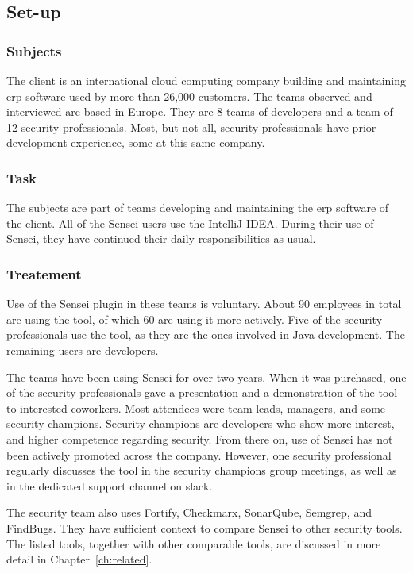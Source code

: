 \subsection{Set-up}

\subsubsection{Subjects}
The client is an international cloud computing company building and maintaining \gls{erp} software used by more than 26,000 customers.
The teams observed and interviewed are based in Europe.
They are 8 teams of developers and a team of 12 security professionals.
Most, but not all, security professionals have prior development experience, some at this same company.

\subsubsection{Task}
The subjects are part of teams developing and maintaining the \gls{erp} software of the client.
All of the Sensei users use the IntelliJ IDEA.
During their use of Sensei, they have continued their daily responsibilities as usual.

\subsubsection{Treatement}
Use of the Sensei plugin in these teams is voluntary.
About 90 employees in total are using the tool, of which 60 are using it more actively.
Five of the security professionals use the tool, as they are the ones involved in Java development.
The remaining users are developers.

The teams have been using Sensei for over two years.
When it was purchased, one of the security professionals gave a presentation and a demonstration of the tool to interested coworkers.
Most attendees were team leads, managers, and some security champions.
Security champions are developers who show more interest, and higher competence regarding security.
From there on, use of Sensei has not been actively promoted across the company.
However, one security professional regularly discusses the tool in the security champions group meetings, as well as in the dedicated support channel on \gls{slack}.

The security team also uses Fortify, Checkmarx, SonarQube, Semgrep, and FindBugs.
They have sufficient context to compare Sensei to other security tools.
The listed tools, together with other comparable tools, are discussed in more detail in Chapter~\ref{ch:related}.

